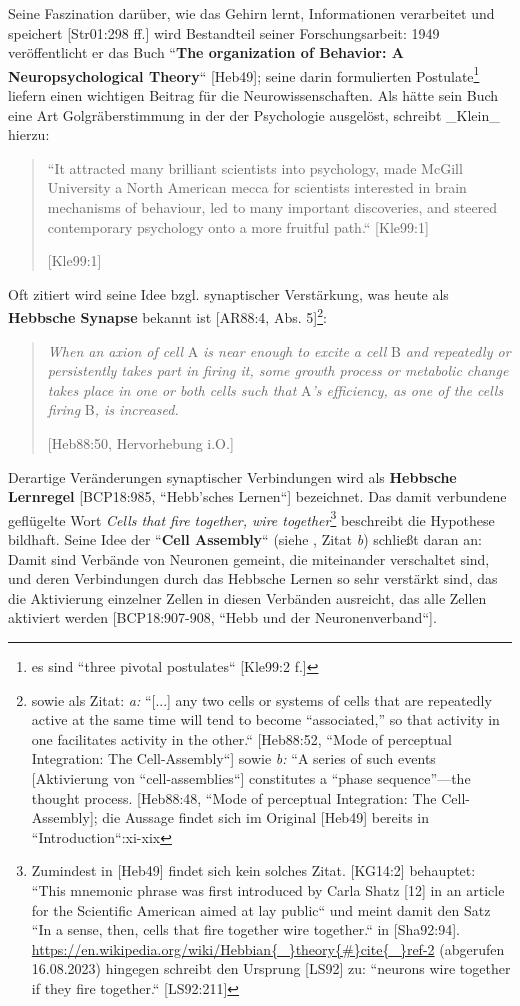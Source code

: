 Seine Faszination darüber, wie das Gehirn lernt, Informationen verarbeitet und speichert [Str01:298 ff.] wird Bestandteil seiner Forschungsarbeit: 1949 veröffentlicht er das Buch ``\textbf{The organization of Behavior: A Neuropsychological Theory}`` [Heb49]; seine darin formulierten Postulate\footnote{
    es sind ``three pivotal postulates`` {[Kle99:2 f.]}
} liefern einen wichtigen Beitrag für die Neurowissenschaften. Als hätte sein Buch eine Art Golgräberstimmung in der der Psychologie ausgelöst, schreibt _Klein_ hierzu:

\blockquote[{[Kle99:1]}]{
    ``It attracted many
    brilliant scientists into psychology, made McGill University a North American mecca for scientists interested in brain mechanisms of behaviour, led to many important discoveries, and steered contemporary psychology onto a more fruitful path.`` [Kle99:1]
}

Oft zitiert wird seine Idee bzgl. synaptischer Verstärkung, was heute als \textbf{Hebbsche Synapse} bekannt ist [AR88:4, Abs. 5]\footnote{
    sowie als Zitat: \textit{a:} ``[...] any two cells or systems of cells that are repeatedly active at the same time will tend to become “associated,” so that activity in one facilitates activity in the other.`` [Heb88:52, ``Mode of perceptual Integration: The Cell-Assembly``] sowie \textit{b:} ``A series of such events [Aktivierung von ``cell-assemblies``] constitutes a “phase sequence”—the thought process. [Heb88:48, ``Mode of perceptual Integration: The Cell-Assembly]; die Aussage findet sich im Original [Heb49] bereits in ``Introduction``:xi-xix
}:

\blockquote[{[Heb88:50, Hervorhebung i.O.]}]{
    \textit{When an axion of cell} A \textit{is near enough to excite a cell} B \textit{and repeatedly or persistently takes part in firing it, some growth process or metabolic change takes place in one or both cells such that} A\textit{'s efficiency, as one of the cells firing} B\textit{, is increased.}
}


Derartige Veränderungen synaptischer Verbindungen wird als \textbf{Hebbsche Lernregel} [BCP18:985, ``Hebb'sches Lernen``] bezeichnet.
Das damit verbundene geflügelte Wort \textit{Cells that fire together, wire together}\footnote{
    Zumindest in [Heb49] findet sich kein solches Zitat. [KG14:2] behauptet: ``This mnemonic phrase was first introduced by Carla Shatz [12] in an article for the Scientific American aimed at lay public`` und meint damit den Satz ``In a sense, then, cells that fire together wire together.`` in [Sha92:94]. \url{https://en.wikipedia.org/wiki/Hebbian{\_}theory{\#}cite{\_}ref-2} (abgerufen 16.08.2023) hingegen schreibt den Ursprung [LS92] zu: ``neurons wire together if they fire together.`` [LS92:211]
} beschreibt die Hypothese bildhaft.
Seine Idee der ``\textbf{Cell Assembly}`` (siehe \footnotemark[6], Zitat \textit{b}) schließt daran an: Damit sind Verbände von Neuronen gemeint, die miteinander verschaltet sind, und deren Verbindungen durch das Hebbsche Lernen so sehr verstärkt sind, das die Aktivierung einzelner Zellen in diesen Verbänden ausreicht, das alle Zellen aktiviert werden [BCP18:907-908, ``Hebb und der Neuronenverband``].


